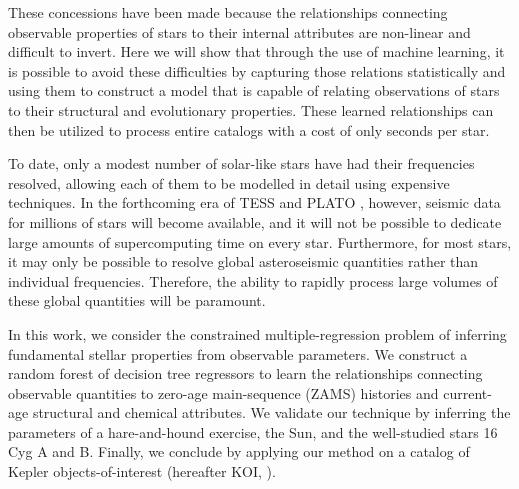 \documentclass[iop,apj,twocolappendix]{emulateapj}
\begin{document}
These concessions have been made because the relationships connecting observable properties of stars to their internal attributes are non-linear and difficult to invert. Here we will show that through the use of machine learning, it is possible to avoid these difficulties by capturing those relations statistically and using them to construct a model that is capable of relating observations of stars to their structural and evolutionary properties. These learned relationships can then be utilized to process entire catalogs with a cost of only seconds per star. 

To date, only a modest number of solar-like stars have had their frequencies resolved, allowing each of them to be modelled in detail using expensive techniques. In the forthcoming era of TESS \citep{2015JATIS...1a4003R} and PLATO \citep{2014ExA....38..249R}, however, seismic data for millions of stars will become available, and it will not be possible to dedicate large amounts of supercomputing time on every star. Furthermore, for most stars, it may only be possible to resolve global asteroseismic quantities rather than individual frequencies. Therefore, the ability to rapidly process large volumes of these global quantities will be paramount. 

In this work, we consider the constrained multiple-regression problem of inferring fundamental stellar properties from observable parameters. We construct a random forest of decision tree regressors to learn the relationships connecting observable quantities to zero-age main-sequence (ZAMS) histories and current-age structural and chemical attributes. We validate our technique by inferring the parameters of a hare-and-hound exercise, the Sun, and the well-studied stars 16 Cyg A and B. Finally, we conclude by applying our method on a catalog of Kepler objects-of-interest (hereafter KOI, \citealt{2016MNRAS.456.2183D}).
\end{document}
